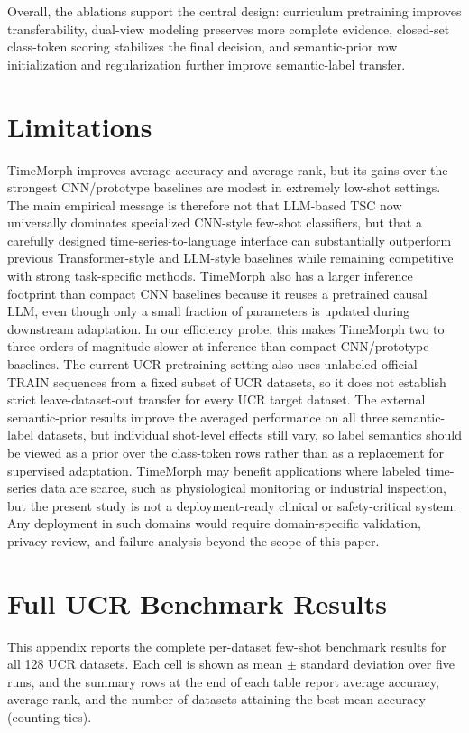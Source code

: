 \documentclass{article}
\begin{document}
Overall, the ablations support the central design: curriculum pretraining improves transferability, dual-view modeling preserves more complete evidence, closed-set class-token scoring stabilizes the final decision, and semantic-prior row initialization and regularization further improve semantic-label transfer.

\section{Limitations}

TimeMorph improves average accuracy and average rank, but its gains over the strongest CNN/prototype baselines are modest in extremely low-shot settings.
The main empirical message is therefore not that LLM-based TSC now universally dominates specialized CNN-style few-shot classifiers, but that a carefully designed time-series-to-language interface can substantially outperform previous Transformer-style and LLM-style baselines while remaining competitive with strong task-specific methods.
TimeMorph also has a larger inference footprint than compact CNN baselines because it reuses a pretrained causal LLM, even though only a small fraction of parameters is updated during downstream adaptation.
In our efficiency probe, this makes TimeMorph two to three orders of magnitude slower at inference than compact CNN/prototype baselines.
The current UCR pretraining setting also uses unlabeled official TRAIN sequences from a fixed subset of UCR datasets, so it does not establish strict leave-dataset-out transfer for every UCR target dataset.
The external semantic-prior results improve the averaged performance on all three semantic-label datasets, but individual shot-level effects still vary, so label semantics should be viewed as a prior over the class-token rows rather than as a replacement for supervised adaptation.
TimeMorph may benefit applications where labeled time-series data are scarce, such as physiological monitoring or industrial inspection, but the present study is not a deployment-ready clinical or safety-critical system.
Any deployment in such domains would require domain-specific validation, privacy review, and failure analysis beyond the scope of this paper.




\appendix

\section{Full UCR Benchmark Results}
\label{app:full-ucr-results}
This appendix reports the complete per-dataset few-shot benchmark results for all 128 UCR datasets. Each cell is shown as mean $\pm$ standard deviation over five runs, and the summary rows at the end of each table report average accuracy, average rank, and the number of datasets attaining the best mean accuracy (counting ties).
\end{document}
